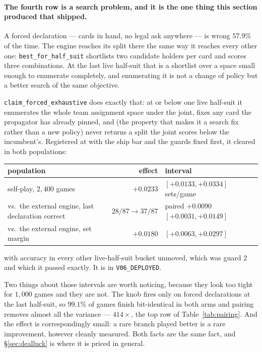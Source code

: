 \documentclass[11pt,letterpaper]{article}
\begin{document}
\paragraph{The fourth row is a search problem, and it is the one thing this
section produced that shipped.} A forced declaration --- cards in hand, no legal
ask anywhere --- is wrong $57.9\%$ of the time. The engine reaches its split
there the same way it reaches every other one: \texttt{best\_for\_half\_suit}
shortlists two candidate holders per card and scores three combinations. At the
last live half-suit that is a shortlist over a space small enough to enumerate
completely, and enumerating it is not a change of policy but a better search of
the same objective.

\texttt{claim\_forced\_exhaustive} does exactly that: at or below one live
half-suit it enumerates the whole team assignment space under the joint, fixes
any card the propagator has already pinned, and (the property that makes it a
search fix rather than a new policy) never returns a split the joint scores
below the incumbent's. Registered at  with
the ship bar and the guards fixed first, it cleared in both populations:

\begin{center}
\small
\begin{tabular}{lrl}
\toprule
population & effect & interval \\
\midrule
self-play, $2{,}400$ games & $+0.0233$ & $[+0.0133, +0.0334]$ sets/game \\
vs.\ the external engine, last declaration correct & $28/87 \to 37/87$ & paired $+0.0090$ $[+0.0031, +0.0149]$ \\
vs.\ the external engine, set margin & $+0.0180$ & $[+0.0063, +0.0297]$ \\
\bottomrule
\end{tabular}
\end{center}

\noindent with accuracy in every other live-half-suit bucket unmoved, which was
guard 2 and which it passed exactly. It is in \texttt{V06\_DEPLOYED}.

Two things about those intervals are worth noticing, because they look too
tight for $1{,}000$ games and they are not. The knob fires only on forced
declarations at the last half-suit, so $99.1\%$ of games finish bit-identical
in both arms and pairing removes almost all the variance --- $414\times$, the
top row of Table~\ref{tab:pairing}. And the effect is correspondingly small:
a rare branch played better is a rare improvement, however cleanly measured.
Both facts are the same fact, and \S\ref{sec:dealluck} is where it is priced in
general.
\end{document}
